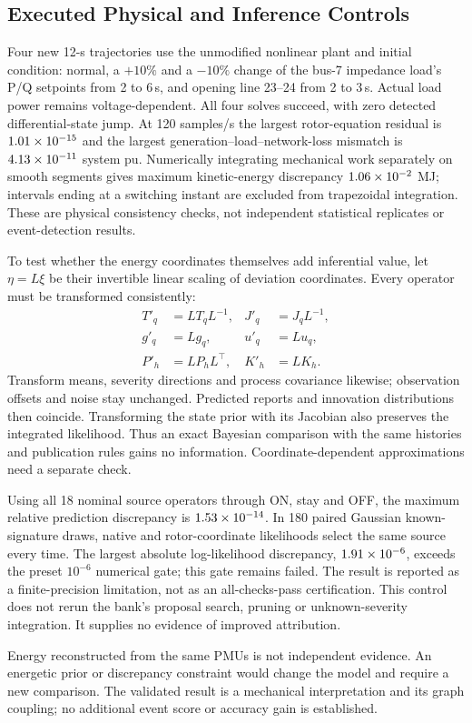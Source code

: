 \subsection{Executed Physical and Inference Controls}
Four new 12-s trajectories use the unmodified nonlinear plant and initial
condition: normal, a $+10\%$ and a $-10\%$ change of the bus-7 impedance
load's P/Q setpoints from 2 to 6\,s, and opening line 23--24 from 2 to 3\,s.
Actual load power remains voltage-dependent. All four solves succeed,
with zero detected differential-state jump. At 120 samples/s the largest
rotor-equation residual is $1.01\times10^{-15}{}$ and the largest
generation--load--network-loss mismatch is $4.13\times10^{-11}{}$ system pu.
Numerically integrating mechanical work separately on smooth segments
gives maximum kinetic-energy discrepancy $1.06\times10^{-2}{}$ MJ; intervals
ending at a switching instant are excluded from trapezoidal integration.
These are physical consistency checks, not independent statistical
replicates or event-detection results.



To test whether the energy coordinates themselves add inferential value,
let $\eta=L\xi$ be their invertible linear scaling of deviation coordinates.
Every operator must be transformed consistently:
\begin{align}
 T'_q&=LT_qL^{-1},&J'_q&=J_qL^{-1},\nonumber\\
 g'_q&=Lg_q,&u'_q&=Lu_q,\nonumber\\
 P'_h&=LP_hL^\top,&K'_h&=LK_h.
\end{align}
Transform means, severity directions and process covariance likewise;
observation offsets and noise stay unchanged. Predicted reports and
innovation distributions then coincide. Transforming the state prior
with its Jacobian also preserves the integrated likelihood. Thus an
exact Bayesian comparison with the same histories and publication rules
gains no information. Coordinate-dependent approximations need a separate check.

Using all 18 nominal source operators through ON, stay and OFF, the maximum
relative prediction discrepancy is $1.53\times10^{-14}{}$. In 180 paired
Gaussian known-signature draws, native and rotor-coordinate likelihoods
select the same source every time. The largest absolute log-likelihood
discrepancy, $1.91\times10^{-6}{}$, exceeds the preset $10^{-6}$ numerical
gate; this gate remains failed. The result is reported as a finite-precision
limitation, not as an all-checks-pass certification. This control does not
rerun the bank's proposal search, pruning or unknown-severity integration.
It supplies no evidence of improved attribution.

Energy reconstructed from the same PMUs is not independent evidence.
An energetic prior or discrepancy constraint would change the model and
require a new comparison. The validated result is a mechanical interpretation
and its graph coupling; no additional event score or accuracy gain is established.
